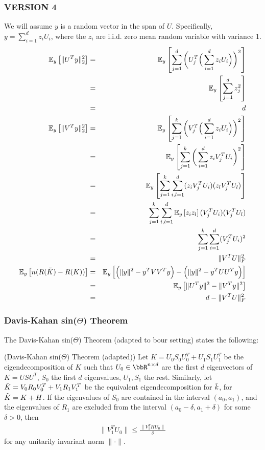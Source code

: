 \subsubsection{VERSION 4}
We will assume $y$ is a random vector in the span of $U$.
Specifically, $y = \sum_{i=1}^d z_i U_i$, where the $z_i$ are i.i.d. zero mean random variable with variance 1.
\begin{eqnarray*}
	\expect{y}{\|U^T y\|_2^2} &=& \expect{y}{\sum_{j=1}^d \bigg( U_j^T \Big(\sum_{i=1}^d z_i U_i\Big)\bigg)^2} \\
	&=& \expect{y}{\sum_{j=1}^d z_j^2} \\
	&=& d \\
	\expect{y}{\|V^T y\|_2^2} &=& \expect{y}{\sum_{j=1}^k \bigg( V_j^T \Big(\sum_{i=1}^d z_i U_i\Big)\bigg)^2} \\
	&=& \expect{y}{\sum_{j=1}^k \bigg(\sum_{i=1}^d z_i V_j^TU_i\bigg)^2} \\
	&=& \expect{y}{\sum_{j=1}^k \sum_{i,l=1}^d (z_i V_j^TU_i) (z_l V_j^TU_l) }\\
	&=& \sum_{j=1}^k \sum_{i,l=1}^d \expect{y}{z_i z_l} (V_j^TU_i) (V_j^TU_l) \\
	&=& \sum_{j=1}^k \sum_{i=1}^d (V_j^TU_i)^2 \\
	&=& \|V^T U\|_F^2\\
	\expect{y}{n(R(\tK) - R(K))} &=& \expect{y}{\Big(\|y\|^2 - y^T VV^T y\Big) - \Big(\|y\|^2 - y^T UU^T y\Big)}\\
	&=& \expect{y}{\|U^T y\|^2 - \|V^Ty\|^2}\\
	&=& d -  \|V^T U\|_F^2\\
\end{eqnarray*}

\subsubsection{Davis-Kahan sin($\Theta$) Theorem}
The Davis-Kahan sin($\Theta$) Theorem (adapted to bour setting) states the following:
\begin{theorem}{(Davis-Kahan sin($\Theta$) Theorem (adapted))}
Let $K=U_0 S_0 U_0^T + U_1 S_1 U_1^T$ be the eigendecomposition of $K$ such that $U_0 \in \RR^{n \times d}$ are the first $d$ eigenvectors of $K=USU^T$, $S_0$ the first $d$ eigenvalues, $U_1,S_1$ the rest.
Similarly, let $\tK = V_0 R_0 V_0^T + V_1 R_1 V_1^T$ be the equivalent eigendecomposition for $\tk$, for $\tK = K + H$.
If the eigenvalues of $S_0$ are contained in the interval $(a_0,a_1)$, and the eigenvalues of $R_1$ are excluded from the interval $(a_0 - \delta,a_1 +\delta)$ for some $\delta>0$, then
\begin{eqnarray}
\|V_1^T U_0\| \leq \frac{\|V_1^T H U_0\|}{\delta}
\end{eqnarray}
for any unitarily invariant norm $\|\cdot \|$.
\end{theorem}

